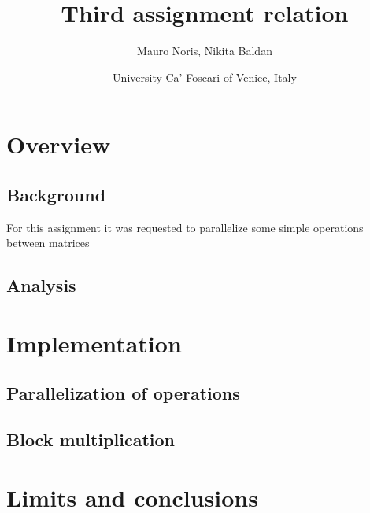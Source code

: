 \documentclass[11pt]{article}
\title{\textbf{Third assignment relation}}
\author{Mauro Noris, Nikita Baldan}
\date{University Ca' Foscari of Venice, Italy}
\begin{document}
\maketitle

\section{Overview}
\subsection{Background}
For this assignment it was requested to parallelize some simple operations between matrices
\subsection{Analysis}
\section{Implementation}
\subsection{Parallelization of operations}
\subsection{Block multiplication}
\section{Limits and conclusions}  
\end{document}
